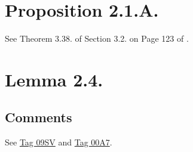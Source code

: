 \section{Proposition 2.1.A.}

See Theorem 3.38. of Section 3.2. on Page 123 of \cite{rotman2009introduction}.

\section{Lemma 2.4.}

\subsection{Comments}
See \href{https://stacks.math.columbia.edu/tag/09SV}{Tag 09SV} and \href{https://stacks.math.columbia.edu/tag/00A7}{Tag 00A7}.